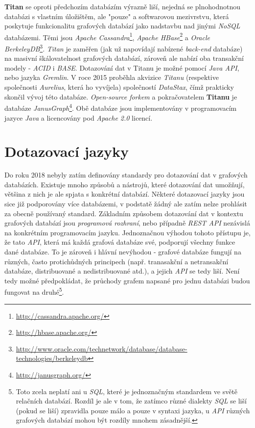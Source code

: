 \textbf{Titan} se oproti předchozím databázím výrazně liší, nejedná se plnohodnotnou databázi s vlastním úložištěm, ale "pouze" a softwarovou mezivrstvu, která poskytuje funkcionalitu grafových databází jako nadstavbu nad jinými \textit{NoSQL} databázemi. Těmi jsou \textit{Apache Cassandra}\footnote{\url{http://cassandra.apache.org/}}, \textit{Apache HBase}\footnote{\url{http://hbase.apache.org/}} a \textit{Oracle BerkeleyDB}\footnote{\url{http://www.oracle.com/technetwork/database/database-technologies/berkeleydb}}.
\textit{Titan} je zaměřen (jak už napovídají nabízené \textit{back-end} databáze) na masivní škálovatelnost grafových databází, zároveň ale nabízí oba transakční modely - \textit{ACID} i \textit{BASE}. Dotazování dat v Titanu je možné pomocí \textit{Java API}, nebo jazyka \textit{Gremlin}. V roce 2015 proběhla akvizice \textit{Titanu} (respektive společnosti \textit{Aurelius}, která ho vyvíjela) společností \textit{DataStax}, čímž prakticky skončil vývoj této databáze. \textit{Open-source forkem} a pokračovatelem\cite{Datami17} \textbf{Titanu} je databáze \textit{JanusGraph}\footnote{\url{http://janusgraph.org/}}. Obě databáze jsou implementovány v programovacím jazyce \textit{Java} a licencovány pod \textit{Apache 2.0} licencí.


\section{Dotazovací jazyky}
\label{sec:gdb-jazyky}

Do roku 2018 nebyly zatím definovány standardy pro dotazování dat v grafových databázích. Existuje mnoho způsobů a nástrojů, které dotazování dat umožňují, většina z nich je ale spjata s konkrétní databází. Některé dotazovací jazyky jsou sice již podporovány více databázemi, v podstatě žádný ale zatím nelze prohlásit za obecně používaný standard. Základním způsobem dotazování dat v kontextu grafových databází jsou \textit{programová rozhraní}, nebo případně \textit{REST API} nezávislá na konkrétním programovacím jazyku. Jednoznačnou výhodou tohoto přístupu je, že tato \textit{API}, která má každá grafová databáze své, podporují všechny funkce dané databáze. To je zároveň i hlávní nevýhodou - grafové databáze fungují na různých, často protichůdných principech (např. tranasakční a netransakční databáze, distribuované a nedistribuované atd.), a jejich \textit{API} se tedy liší. Není tedy možné předpokládat, že průchody grafem napsané pro jednu databázi budou fungovat na druhé\footnote{Toto zcela neplatí ani u \textit{SQL}, které je jednoznačným standardem ve světě relačních databází. Rozdíl je ale v tom, že zatímco různé dialekty \textit{SQL} se liší (pokud se liší) zpravidla pouze málo a pouze v syntaxi jazyka, u \textit{API} různých grafových databází mohou být rozdíly mnohem zásadnější.}.

